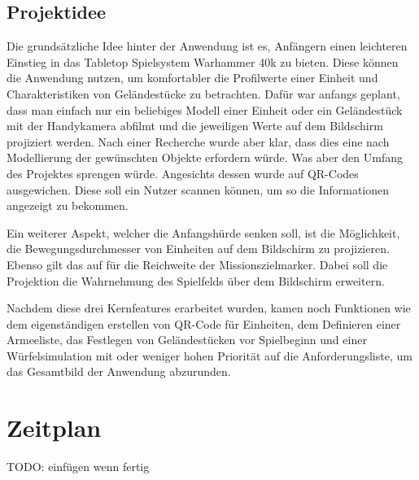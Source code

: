 \subsection{Projektidee}
Die grundsätzliche Idee hinter der Anwendung ist es, Anfängern einen leichteren Einstieg in das Tabletop Spielsystem Warhammer 40k zu bieten. Diese können die Anwendung nutzen, um komfortabler die Profilwerte einer Einheit und Charakteristiken von Geländestücke zu betrachten. Dafür war anfangs geplant, dass man einfach nur ein beliebiges Modell einer Einheit oder ein Geländestück mit der Handykamera abfilmt und die jeweiligen Werte auf dem Bildschirm projiziert werden. Nach einer Recherche wurde aber klar, dass dies eine nach Modellierung der gewünschten Objekte erfordern würde. Was aber den Umfang des Projektes sprengen würde. Angesichts dessen wurde auf QR-Codes ausgewichen. Diese soll ein Nutzer scannen können, um so die Informationen angezeigt zu bekommen.\newline

Ein weiterer Aspekt, welcher die Anfangshürde senken soll, ist die Möglichkeit, die Bewegungsdurchmesser von Einheiten auf dem Bildschirm zu projizieren. Ebenso gilt das auf für die Reichweite der Missionszielmarker. Dabei soll die Projektion die Wahrnehmung des Spielfelds über dem Bildschirm erweitern.\newline

Nachdem diese drei Kernfeatures erarbeitet wurden, kamen noch Funktionen wie dem eigenständigen erstellen von QR-Code für Einheiten, dem Definieren einer Armeeliste, das Festlegen von Geländestücken vor Spielbeginn und einer Würfelsimulation mit oder weniger hohen Priorität auf die Anforderungsliste, um das Gesamtbild der Anwendung abzurunden.

\section{Zeitplan}

TODO: einfügen wenn fertig


